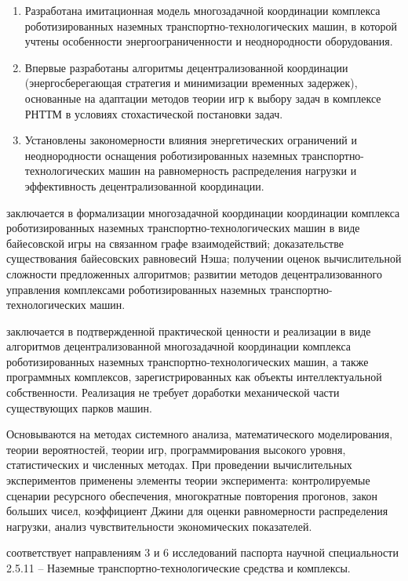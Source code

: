 {\novelty}
\begin{enumerate}[beginpenalty=10000, midpenalty=10000, wide=\parindent, leftmargin=0pt]
  \item Разработана имитационная модель многозадачной координации комплекса роботизированных наземных транспортно-технологических машин, в которой учтены особенности энергоограниченности и неоднородности оборудования.
  \item Впервые разработаны алгоритмы децентрализованной координации (энергосберегающая стратегия и минимизации временных задержек), основанные на адаптации методов теории игр к выбору задач в комплексе РНТТМ в условиях стохастической постановки задач.
  \item Установлены закономерности влияния энергетических ограничений и неоднородности оснащения роботизированных наземных транспортно-технологических машин на равномерность распределения нагрузки и эффективность децентрализованной координации.
\end{enumerate}

{\influencetheor} заключается в формализации многозадачной координации координации комплекса роботизированных наземных транспортно-технологических машин в виде байесовской игры на связанном графе взаимодействий; доказательстве существования байесовских равновесий Нэша; получении оценок вычислительной сложности предложенных алгоритмов; развитии методов децентрализованного управления комплексами роботизированных наземных транспортно-технологических машин.

{\influence} заключается в подтвержденной практической ценности и реализации в виде алгоритмов децентрализованной многозадачной координации комплекса роботизированных наземных транспортно-технологических машин, а также программных комплексов, зарегистрированных как объекты интеллектуальной собственности. Реализация не требует доработки механической части существующих парков машин.

{\methods} Основываются на методах системного анализа, математического моделирования, теории вероятностей, теории игр, программирования высокого уровня, статистических и численных методах. При проведении вычислительных экспериментов применены элементы теории эксперимента: контролируемые сценарии ресурсного обеспечения, многократные повторения прогонов, закон больших чисел, коэффициент Джини для оценки равномерности распределения нагрузки, анализ чувствительности экономических показателей.

{\scope} соответствует направлениям 3 и 6 исследований паспорта научной специальности 2.5.11 -- Наземные транспортно-технологические средства и комплексы.

